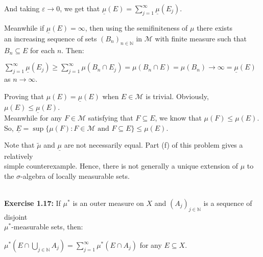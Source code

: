 \documentclass{book}
\newenvironment{myIndent}{%
   \begin{adjustwidth}{2.5em}{0em}%
}{%
   \end{adjustwidth}%
}
\newcommand{\blab}[1]{\textbf{#1}}
\newcommand{\mySepTwo}[1][.]{%
   {\noindent\color{#1}{\rule{6.5in}{0.5mm}}}\\%
}
\newcommand{\retTwo}{\hfill\bigbreak}
\begin{document}
\begin{enumerate}
\begin{myIndent}
      And taking $\varepsilon \rightarrow 0$, we get that $\underline{\mu}(E) = \sum\limits_{j=1}^\infty \underline{\mu}(E_j)$.\retTwo

		Meanwhile if $\underline{\mu}(E) = \infty$, then using the semifiniteness of $\mu$ there exists\\ an increasing sequence of sets $(B_n)_{n \in \mathbb{N}}$ in $\mathcal{M}$ with finite measure such that\\ $B_n \subseteq E$ for each $n$. Then:

		{\centering $\sum\limits_{j=1}^\infty \underline{\mu}(E_j) \geq \sum\limits_{j=1}^\infty \mu(B_n \cap E_j) = \mu(B_n \cap E) = \mu(B_n) \to \infty = \underline{\mu}(E)$ as $n \to \infty$. \retTwo\par}

      Proving that $\mu(E) = \underline{\mu}(E)$ when $E \in \mathcal{M}$ is trivial. Obviously, $\mu(E) \leq \underline{\mu}(E)$.\\ [2pt] Meanwhile for any $F \in \mathcal{M}$ satisfying that $F \subseteq E$, we know that $\mu(F) \leq \mu(E)$.\\ [2pt] So, $\underline{E} = \sup\{\mu(F) : F \in \mathcal{M} \text{ and } F \subseteq E\} \leq \mu(E)$.\retTwo
   \end{myIndent}

   Note that $\widetilde{\mu}$ and $\underline{\mu}$ are not necessarily equal. Part (f) of this problem gives a relatively\\ [0pt] simple counterexample. Hence, there is not generally a unique extension of $\mu$ to the $\sigma$-algebra of locally measurable sets.
\end{enumerate}

\mySepTwo

\blab{Exercise 1.17:} If $\mu^*$ is an outer measure on $X$ and $(A_j)_{j\in \mathbb{N}}$ is a sequence of disjoint\\ $\mu^*$-measurable sets, then:

{\centering $\mu^*(E \cap \bigcup\limits_{j \in \mathbb{N}}A_j) = \sum\limits_{j=1}^\infty \mu^*(E \cap A_j)$ for any $E \subseteq X$.\retTwo\par}
\end{document}
